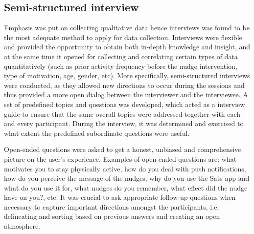     \subsection{Semi-structured interview}
    Emphasis was put on collecting qualitative data hence interviews was found to be the most adequate method to apply for data collection. Interviews were flexible and provided the opportunity to obtain both in-depth knowledge and insight, and at the same time it opened for collecting and correlating certain types of data quantitatively (such as prior activity frequency before the nudge intervention,  type of motivation, age, gender, etc). More specifically, semi-structured interviews were conducted, as they allowed new directions to occur during the sessions and thus provided a more open dialog between the interviewer and the interviewee. A set of predefined topics and questions was developed, which acted as a interview guide to ensure that the same overall topics were addressed together with each and every participant. During the interview, it was determined and exercised to what extent the predefined subordinate questions were useful. 

    Open-ended questions were asked to get a honest, unbiased and comprehensive picture on the user’s experience. Examples of open-ended questions are: what motivates you to stay physically active, how do you deal with push notifications, how do you perceive the message of the nudges, why do you use the Sats app and what do you use it for, what nudges do you remember, what effect did the nudge have on you?, etc. It was crucial to ask appropriate follow-up questions when necessary to capture important directions amongst the participants, i.e. delineating and sorting based on previous answers and creating an open atmosphere.
  
